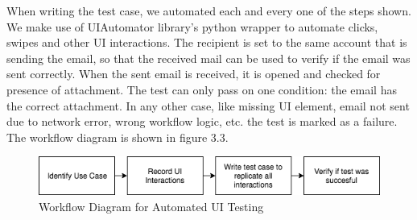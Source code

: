 When writing the test case, we automated each and every one of the steps shown. We make use of UIAutomator library's python wrapper\cite{uiautomatordoc} to automate clicks, swipes and other UI interactions. The recipient is set to the same account that is sending the email, so that the received mail can be used to verify if the email was sent correctly. When the sent email is received, it is opened and checked for presence of attachment. The test can only pass on one condition: the email has the correct attachment. In any other case, like missing UI element, email not sent due to network error, wrong workflow logic, etc. the test is marked as a failure. The workflow diagram is shown in figure 3.3.

\vspace{0.5cm}
\begin{figure}[!h]
 	\begin{center}
		\includegraphics[scale=0.7]{Workflow2}
		\caption{Workflow Diagram for Automated UI Testing}
	\end{center}
\end{figure}
